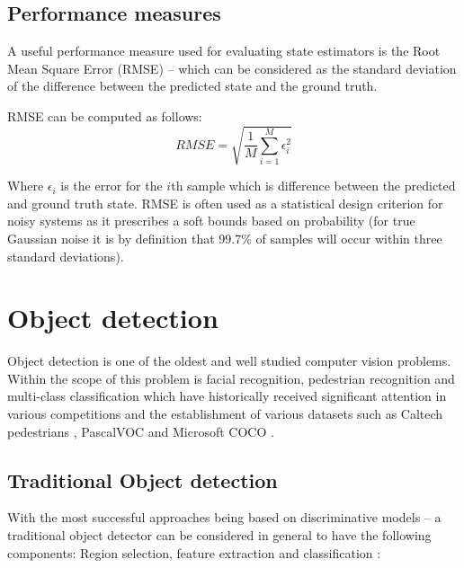 \documentclass[a4paper,twoside,12pt]{report}
\begin{document}
\subsection{Performance measures}

A useful performance measure used for evaluating state estimators is the Root Mean Square Error (RMSE) -- which can be considered as the standard deviation of the difference between the predicted state and the ground truth. \citep{kalmanperform}

RMSE can be computed as follows:
\begin{equation}
RMSE = \sqrt{\frac{1}{M}\sum^{M}_{i=1}\epsilon_{i}^{2}}
\end{equation}

Where $\epsilon_{i}$ is the error for the $i$th sample which is difference between the predicted and ground truth state. RMSE is often used as a statistical design criterion for noisy systems as it prescribes a soft bounds based on probability (for true Gaussian noise it is by definition that 99.7\% of samples will occur within three standard deviations).

\newpage
\section{Object detection}

Object detection is one of the oldest and well studied computer vision problems. Within the scope of this problem is facial recognition, pedestrian recognition and multi-class classification which have historically received significant attention in various competitions and the establishment of various  datasets such as Caltech pedestrians \citep{peddetect}, PascalVOC \citep{vocdataset} and Microsoft COCO \citep{coco}.

\subsection{Traditional Object detection}

With the most successful approaches being based on discriminative models -- a traditional object detector can be considered in general to have the following components:  Region selection, feature extraction and classification \citep{deepreview}:
\end{document}
